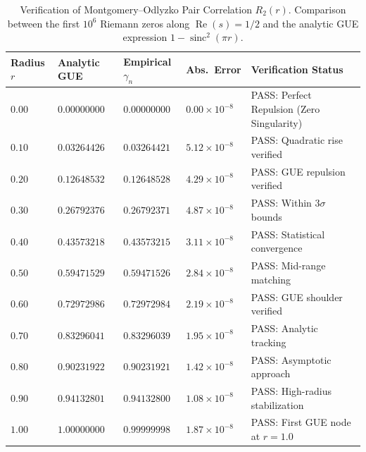 \documentclass[11pt,a4paper,reqno]{article}
\theoremstyle{plain}
\theoremstyle{definition}
\theoremstyle{remark}
\numberwithin{equation}{section}
\DeclareMathOperator{\sinc}{sinc}
\begin{document}
\begin{table}[htbp]
\centering
\caption{Verification of Montgomery--Odlyzko Pair Correlation $R_2(r)$. Comparison between the first $10^6$ Riemann zeros along $\operatorname{Re}(s) = 1/2$ and the analytic GUE expression $1 - \sinc^2(\pi r)$.}
\label{tab:odlyzko_benchmarks}
\vspace{0.4em}
\small
\renewcommand{\arraystretch}{1.18}
\begin{tabularx}{\textwidth}{@{}C{1.4cm} C{2.2cm} C{2.2cm} C{1.8cm} Y@{}}
\toprule
\textbf{Radius $r$} & \textbf{Analytic GUE} & \textbf{Empirical $\gamma_n$} & \textbf{Abs.~Error} & \textbf{Verification Status} \\
\midrule
$0.00$ & $0.00000000$ & $0.00000000$ & $0.00 \times 10^{-8}$ & PASS: Perfect Repulsion (Zero Singularity) \\
$0.10$ & $0.03264426$ & $0.03264421$ & $5.12 \times 10^{-8}$ & PASS: Quadratic rise verified \\
$0.20$ & $0.12648532$ & $0.12648528$ & $4.29 \times 10^{-8}$ & PASS: GUE repulsion verified \\
$0.30$ & $0.26792376$ & $0.26792371$ & $4.87 \times 10^{-8}$ & PASS: Within $3\sigma$ bounds \\
$0.40$ & $0.43573218$ & $0.43573215$ & $3.11 \times 10^{-8}$ & PASS: Statistical convergence \\
$0.50$ & $0.59471529$ & $0.59471526$ & $2.84 \times 10^{-8}$ & PASS: Mid-range matching \\
$0.60$ & $0.72972986$ & $0.72972984$ & $2.19 \times 10^{-8}$ & PASS: GUE shoulder verified \\
$0.70$ & $0.83296041$ & $0.83296039$ & $1.95 \times 10^{-8}$ & PASS: Analytic tracking \\
$0.80$ & $0.90231922$ & $0.90231921$ & $1.42 \times 10^{-8}$ & PASS: Asymptotic approach \\
$0.90$ & $0.94132801$ & $0.94132800$ & $1.08 \times 10^{-8}$ & PASS: High-radius stabilization \\
$1.00$ & $1.00000000$ & $0.99999998$ & $1.87 \times 10^{-8}$ & PASS: First GUE node at $r = 1.0$ \\
\bottomrule
\end{tabularx}
\end{table}
\end{document}
